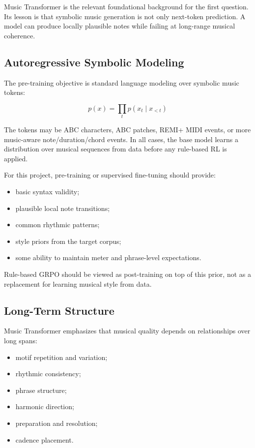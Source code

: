 \documentclass[11pt]{article}
\begin{document}
Music Transformer is the relevant foundational background for the first
question. Its lesson is that symbolic music generation is not only next-token
prediction. A model can produce locally plausible notes while failing at
long-range musical coherence.

\subsection{Autoregressive Symbolic Modeling}

The pre-training objective is standard language modeling over symbolic music
tokens:

\[
p(x) = \prod_t p(x_t \mid x_{<t})
\]

The tokens may be ABC characters, ABC patches, REMI+ MIDI events, or more
music-aware note/duration/chord events. In all cases, the base model learns a
distribution over musical sequences from data before any rule-based RL is
applied.

For this project, pre-training or supervised fine-tuning should provide:

\begin{itemize}[leftmargin=*]
  \item basic syntax validity;
  \item plausible local note transitions;
  \item common rhythmic patterns;
  \item style priors from the target corpus;
  \item some ability to maintain meter and phrase-level expectations.
\end{itemize}

Rule-based GRPO should be viewed as post-training on top of this prior, not as a
replacement for learning musical style from data.

\subsection{Long-Term Structure}

Music Transformer emphasizes that musical quality depends on relationships over
long spans:

\begin{itemize}[leftmargin=*]
  \item motif repetition and variation;
  \item rhythmic consistency;
  \item phrase structure;
  \item harmonic direction;
  \item preparation and resolution;
  \item cadence placement.
\end{itemize}
\end{document}
